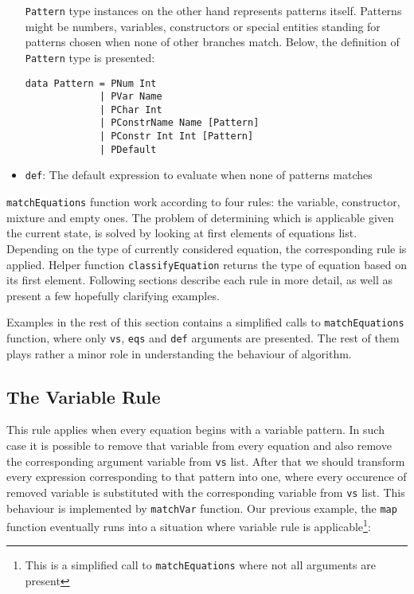 \documentclass[a4paper]{report}
\begin{document}
\begin{itemize}
\texttt{Pattern} type instances on the other hand represents patterns itself.
Patterns might be numbers, variables, constructors or special entities standing
for patterns chosen when none of other branches match. Below, the definition of
\texttt{Pattern} type is presented:
\begin{lstlisting}
data Pattern = PNum Int
             | PVar Name
             | PChar Int
             | PConstrName Name [Pattern]
             | PConstr Int Int [Pattern]
             | PDefault
\end{lstlisting}


  \item \texttt{def}: The default expression to evaluate when none of patterns
    matches
\end{itemize}

\texttt{matchEquations} function work according to four rules: the variable,
constructor, mixture and empty ones. The problem of determining which is
applicable given the current state, is solved by looking at first elements of
equations list. Depending on the type of currently considered equation, the
corresponding rule is applied. Helper function \texttt{classifyEquation}
returns the type of equation based on its first element. Following sections
describe each rule in more detail, as well as present a few hopefully
clarifying examples.

Examples in the rest of this section contains a simplified calls to
\texttt{matchEquations} function, where only \texttt{vs}, \texttt{eqs} and
\texttt{def} arguments are presented. The rest of them plays rather a minor
role in understanding the behaviour of algorithm.


\subsection{The Variable Rule}
This rule applies when every equation begins with a variable pattern. In such
case it is possible to remove that variable from every equation and also remove
the corresponding argument variable from \texttt{vs} list. After that we should
transform every expression corresponding to that pattern into one, where every
occurence of removed variable is substituted with the corresponding variable
from \texttt{vs} list. This behaviour is implemented by \texttt{matchVar}
function.
Our previous example, the \texttt{map} function eventually runs into a situation
where variable rule is applicable\footnote{This is a simplified call to
\texttt{matchEquations} where not all arguments are present}:
\end{document}
